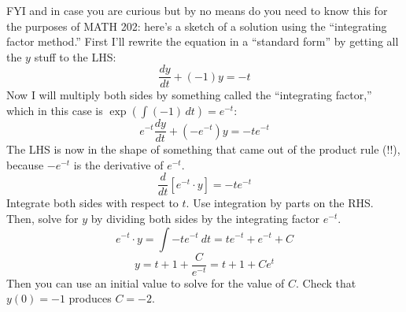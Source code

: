 \documentclass[10pt]{article}
\newenvironment{blue}{\color{blue}}{\ignorespacesafterend}
\begin{document}
\begin{blue}
FYI and in case you are curious but by no means do you need to know this for the purposes of MATH 202: here's a sketch of a solution using the ``integrating factor method.'' First I'll rewrite the equation in a ``standard form'' by getting all the $y$ stuff to the LHS:
\[\frac{dy}{dt} + (-1) y = -t\]
Now I will multiply both sides by something called the ``integrating factor,'' which in this case is $\exp(\int(-1)\, dt) = e^{-t}$:
\[e^{-t} \frac{dy}{dt} + (-e^{-t}) y = -t e^{-t}\]
The LHS is now in the shape of something that came out of the product rule (!!), because $-e^{-t}$ is the derivative of $e^{-t}$.
\[\frac{d}{dt} \left[ e^{-t} \cdot y \right] = -t e^{-t}\]
Integrate both sides with respect to $t$. Use integration by parts on the RHS. Then, solve for $y$ by dividing both sides by the integrating factor $e^{-t}$.
\[e^{-t}\cdot y = \int -te^{-t}\ dt = t e^{-t} + e^{-t} + C\]
\[y = t + 1 + \frac{C}{e^{-t}} = t + 1 + Ce^t\]
Then you can use an initial value to solve for the value of $C$. Check that $y(0) = -1$ produces $C = -2$.
\end{blue}
\end{document}
